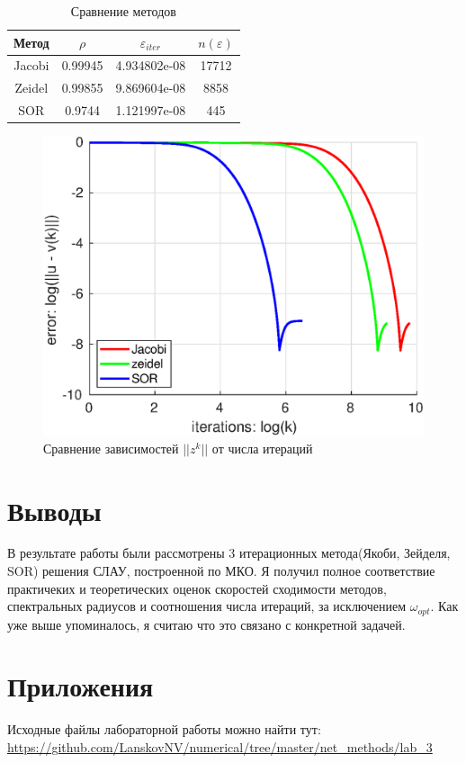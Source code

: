 \documentclass[12pt]{article}
\begin{document}
\begin{table}[H]
\caption{Сравнение методов}
\begin{center}
\begin{tabular}{|c|c|c|c|}
\hline
Метод & $\rho$ & $\varepsilon_{iter}$ & $n(\varepsilon)$ \\
\hline
Jacobi & 0.99945 & 4.934802e-08 & 17712 \\
\hline
Zeidel & 0.99855 & 9.869604e-08 & 8858 \\
\hline
SOR & 0.9744 & 1.121997e-08 & 445 \\
\hline
\end{tabular}
\end{center}
\label{tb1}
\end{table}


\begin{figure}[H]
\centerline{\includegraphics[scale = 0.8]{compare.eps}}
\caption{Сравнение зависимостей $||z^k||$ от числа итераций}
\end{figure}

\newpage

\section{Выводы}

В результате работы были рассмотрены 3 итерационных метода(Якоби, Зейделя, SOR) решения СЛАУ, построенной по МКО. Я получил полное соответствие практичеких и теоретических оценок скоростей сходимости методов, спектральных радиусов и соотношения числа итераций, за исключением $\omega_{opt}$. Как уже выше упоминалось, я считаю что это связано с конкретной задачей.

\section{Приложения}
Исходные файлы лабораторной работы можно найти тут: \\
\url{https://github.com/LanskovNV/numerical/tree/master/net_methods/lab_3}
\end{document}

